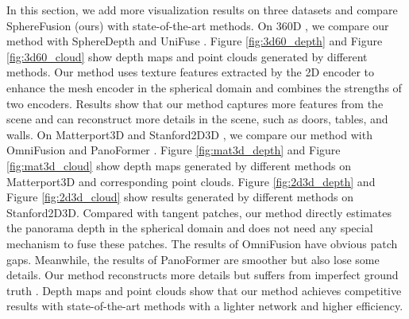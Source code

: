 In this section, we add more visualization results on three datasets and compare SphereFusion (ours) with state-of-the-art methods. 
On 360D \cite{zioulis2018omnidepth}, we compare our method with SphereDepth \cite{yan2022spheredepth} and UniFuse \cite{jiang2021unifuse}. Figure \ref{fig:3d60_depth} and Figure \ref{fig:3d60_cloud} show depth maps and point clouds generated by different methods. Our method uses texture features extracted by the 2D encoder to enhance the mesh encoder in the spherical domain and combines the strengths of two encoders. Results show that our method captures more features from the scene and can reconstruct more details in the scene, such as doors, tables, and walls. 
On Matterport3D \cite{chang2017matterport3d} and Stanford2D3D \cite{armeni2017joint}, we compare our method with OmniFusion \cite{yan2022spheredepth} and PanoFormer \cite{jiang2021unifuse}. Figure \ref{fig:mat3d_depth} and Figure \ref{fig:mat3d_cloud} show depth maps generated by different methods on Matterport3D and corresponding point clouds. Figure \ref{fig:2d3d_depth} and Figure \ref{fig:2d3d_cloud} show results generated by different methods on Stanford2D3D. Compared with tangent patches, our method directly estimates the panorama depth in the spherical domain and does not need any special mechanism to fuse these patches. The results of OmniFusion have obvious patch gaps. Meanwhile, the results of PanoFormer are smoother but also lose some details. Our method reconstructs more details but suffers from imperfect ground truth \cite{jiang2021unifuse}. Depth maps and point clouds show that our method achieves competitive results with state-of-the-art methods with a lighter network and higher efficiency.




